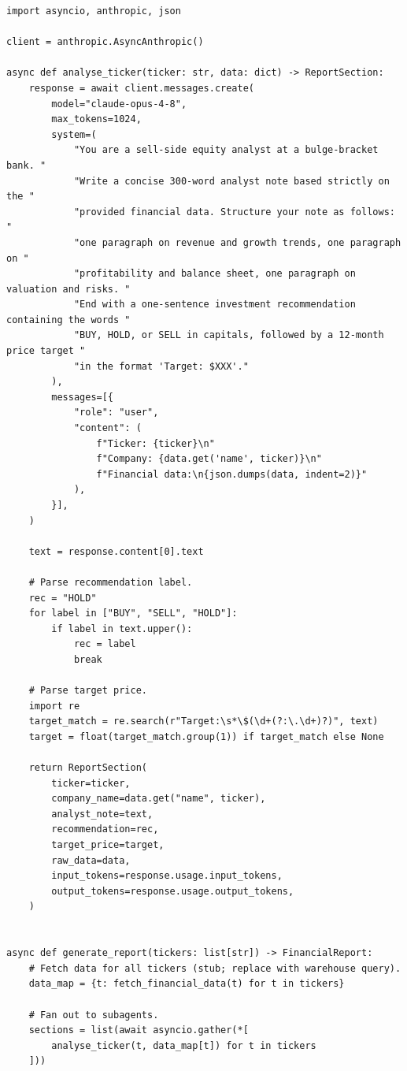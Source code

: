 \begin{verbatim}
import asyncio, anthropic, json

client = anthropic.AsyncAnthropic()

async def analyse_ticker(ticker: str, data: dict) -> ReportSection:
    response = await client.messages.create(
        model="claude-opus-4-8",
        max_tokens=1024,
        system=(
            "You are a sell-side equity analyst at a bulge-bracket bank. "
            "Write a concise 300-word analyst note based strictly on the "
            "provided financial data. Structure your note as follows: "
            "one paragraph on revenue and growth trends, one paragraph on "
            "profitability and balance sheet, one paragraph on valuation and risks. "
            "End with a one-sentence investment recommendation containing the words "
            "BUY, HOLD, or SELL in capitals, followed by a 12-month price target "
            "in the format 'Target: $XXX'."
        ),
        messages=[{
            "role": "user",
            "content": (
                f"Ticker: {ticker}\n"
                f"Company: {data.get('name', ticker)}\n"
                f"Financial data:\n{json.dumps(data, indent=2)}"
            ),
        }],
    )

    text = response.content[0].text

    # Parse recommendation label.
    rec = "HOLD"
    for label in ["BUY", "SELL", "HOLD"]:
        if label in text.upper():
            rec = label
            break

    # Parse target price.
    import re
    target_match = re.search(r"Target:\s*\$(\d+(?:\.\d+)?)", text)
    target = float(target_match.group(1)) if target_match else None

    return ReportSection(
        ticker=ticker,
        company_name=data.get("name", ticker),
        analyst_note=text,
        recommendation=rec,
        target_price=target,
        raw_data=data,
        input_tokens=response.usage.input_tokens,
        output_tokens=response.usage.output_tokens,
    )


async def generate_report(tickers: list[str]) -> FinancialReport:
    # Fetch data for all tickers (stub; replace with warehouse query).
    data_map = {t: fetch_financial_data(t) for t in tickers}

    # Fan out to subagents.
    sections = list(await asyncio.gather(*[
        analyse_ticker(t, data_map[t]) for t in tickers
    ]))


\end{verbatim}
